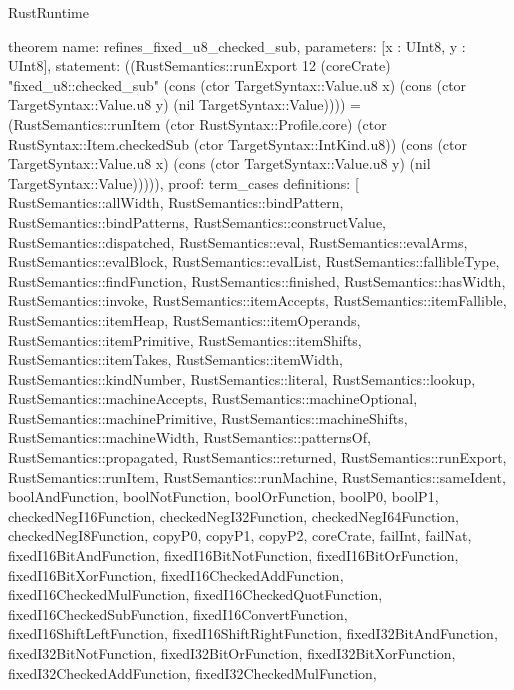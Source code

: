\begin{lexlean}{RustRuntime}
\begin{semanticmodule}
theorem{
  name: refines_fixed_u8_checked_sub,
  parameters: [x : UInt8, y : UInt8],
  statement: ((RustSemantics::runExport 12 (coreCrate) "fixed_u8::checked_sub" (cons (ctor TargetSyntax::Value.u8 x) (cons (ctor TargetSyntax::Value.u8 y) (nil TargetSyntax::Value)))) = (RustSemantics::runItem (ctor RustSyntax::Profile.core) (ctor RustSyntax::Item.checkedSub (ctor TargetSyntax::IntKind.u8)) (cons (ctor TargetSyntax::Value.u8 x) (cons (ctor TargetSyntax::Value.u8 y) (nil TargetSyntax::Value))))),
  proof: term_cases{
    definitions: [
      RustSemantics::allWidth,
      RustSemantics::bindPattern,
      RustSemantics::bindPatterns,
      RustSemantics::constructValue,
      RustSemantics::dispatched,
      RustSemantics::eval,
      RustSemantics::evalArms,
      RustSemantics::evalBlock,
      RustSemantics::evalList,
      RustSemantics::fallibleType,
      RustSemantics::findFunction,
      RustSemantics::finished,
      RustSemantics::hasWidth,
      RustSemantics::invoke,
      RustSemantics::itemAccepts,
      RustSemantics::itemFallible,
      RustSemantics::itemHeap,
      RustSemantics::itemOperands,
      RustSemantics::itemPrimitive,
      RustSemantics::itemShifts,
      RustSemantics::itemTakes,
      RustSemantics::itemWidth,
      RustSemantics::kindNumber,
      RustSemantics::literal,
      RustSemantics::lookup,
      RustSemantics::machineAccepts,
      RustSemantics::machineOptional,
      RustSemantics::machinePrimitive,
      RustSemantics::machineShifts,
      RustSemantics::machineWidth,
      RustSemantics::patternsOf,
      RustSemantics::propagated,
      RustSemantics::returned,
      RustSemantics::runExport,
      RustSemantics::runItem,
      RustSemantics::runMachine,
      RustSemantics::sameIdent,
      boolAndFunction,
      boolNotFunction,
      boolOrFunction,
      boolP0,
      boolP1,
      checkedNegI16Function,
      checkedNegI32Function,
      checkedNegI64Function,
      checkedNegI8Function,
      copyP0,
      copyP1,
      copyP2,
      coreCrate,
      failInt,
      failNat,
      fixedI16BitAndFunction,
      fixedI16BitNotFunction,
      fixedI16BitOrFunction,
      fixedI16BitXorFunction,
      fixedI16CheckedAddFunction,
      fixedI16CheckedMulFunction,
      fixedI16CheckedQuotFunction,
      fixedI16CheckedSubFunction,
      fixedI16ConvertFunction,
      fixedI16ShiftLeftFunction,
      fixedI16ShiftRightFunction,
      fixedI32BitAndFunction,
      fixedI32BitNotFunction,
      fixedI32BitOrFunction,
      fixedI32BitXorFunction,
      fixedI32CheckedAddFunction,
      fixedI32CheckedMulFunction,
}}
\end{semanticmodule}
\end{lexlean}
